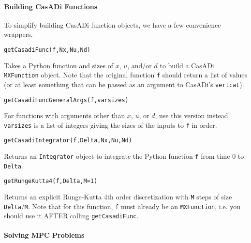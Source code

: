 \documentclass[twocolumn]{article}
\newcommand{\funcname}[1]{\vspace{.25em}\noindent\texttt{#1}\vspace{.25em}}
\newcommand{\casadi}{CasADi}
\begin{document}
\paragraph*{Building \casadi{} Functions}

To simplify building \casadi{} function objects, we have a few convenience wrappers.

\funcname{getCasadiFunc(f,Nx,Nu,Nd)}

Takes a Python function and sizes of $x$, $u$, and/or $d$ to build a \casadi{} \texttt{MXFunction} object.
Note that the original function \texttt{f} should return a list of values (or at least something that can be passed as an argument to \casadi's \texttt{vertcat}).

\funcname{getCasadiFuncGeneralArgs(f,varsizes)}

For functions with arguments other than $x$, $u$, or $d$, use this version instead. \texttt{varsizes} is a list of integers giving the sizes of the inputs to \texttt{f} in order.

\funcname{getCasadiIntegrator(f,Delta,Nx,Nu,Nd)}

Returns an \texttt{Integrator} object to integrate the Python function \texttt{f} from time 0 to \texttt{Delta}.

\funcname{getRungeKutta4(f,Delta,M=1)}

Returns an explicit Runge-Kutta 4th order discretization with \texttt{M} steps of size \texttt{Delta}/\texttt{M}.
Note that for this function, \texttt{f} must already be an \texttt{MXFunction}, i.e. you should use it AFTER calling \texttt{getCasadiFunc}.

\paragraph*{Solving MPC Problems}
\end{document}

